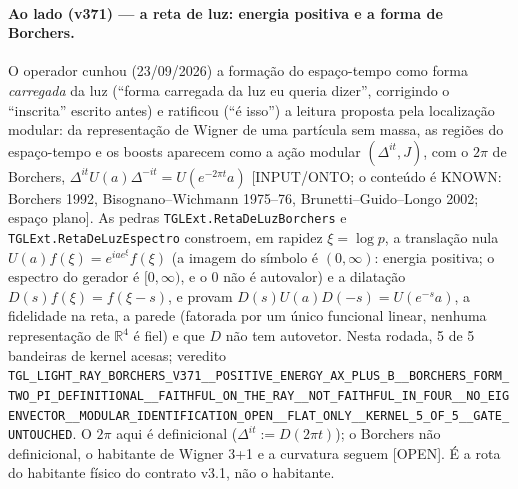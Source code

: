 \documentclass[11pt]{article}
\theoremstyle{definition}\newtheorem{deriv}{Derivação}
\begin{document}
\paragraph*{Ao lado (v371) --- a reta de luz: energia positiva e a forma de Borchers.} O operador cunhou (23/09/2026) a formação do espaço-tempo como forma \emph{carregada} da luz (``forma carregada da luz eu queria dizer'', corrigindo o ``inscrita'' escrito antes) e ratificou (``é isso'') a leitura proposta pela localização modular: da representação de Wigner de uma partícula sem massa, as regiões do espaço-tempo e os boosts aparecem como a ação modular $(\Delta^{it},J)$, com o $2\pi$ de Borchers, $\Delta^{it}U(a)\Delta^{-it}=U(e^{-2\pi t}a)$ [INPUT/ONTO; o conteúdo é KNOWN: Borchers 1992, Bisognano--Wichmann 1975--76, Brunetti--Guido--Longo 2002; espaço plano]. As pedras \texttt{TGLExt.RetaDeLuzBorchers} e \texttt{TGLExt.RetaDeLuzEspectro} constroem, em rapidez $\xi=\log p$, a translação nula $U(a)f(\xi)=e^{ia e^{\xi}}f(\xi)$ (a imagem do símbolo é $(0,\infty)$: energia positiva; o espectro do gerador é $[0,\infty)$, e o $0$ não é autovalor) e a dilatação $D(s)f(\xi)=f(\xi-s)$, e provam $D(s)U(a)D(-s)=U(e^{-s}a)$, a fidelidade na reta, a parede (fatorada por um único funcional linear, nenhuma representação de $\mathbb{R}^4$ é fiel) e que $D$ não tem autovetor. Nesta rodada, 5 de 5 bandeiras de kernel acesas; veredito \texttt{TGL\_LIGHT\_RAY\_BORCHERS\_V371\_\_POSITIVE\_ENERGY\_AX\_PLUS\_B\_\_BORCHERS\_FORM\_TWO\_PI\_DEFINITIONAL\_\_FAITHFUL\_ON\_THE\_RAY\_\_NOT\_FAITHFUL\_IN\_FOUR\_\_NO\_EIGENVECTOR\_\_MODULAR\_IDENTIFICATION\_OPEN\_\_FLAT\_ONLY\_\_KERNEL\_5\_OF\_5\_\_GATE\_UNTOUCHED}. O $2\pi$ aqui é definicional ($\Delta^{it}:=D(2\pi t)$); o Borchers não definicional, o habitante de Wigner 3+1 e a curvatura seguem [OPEN]. É a rota do habitante físico do contrato v3.1, não o habitante.
\end{document}
